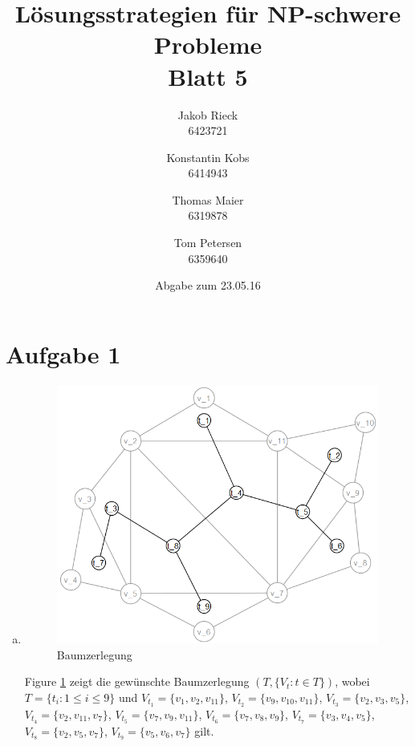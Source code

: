 \documentclass[12pt,a4paper]{article}
\title{Lösungsstrategien für NP-schwere Probleme\\Blatt 5}
\author{
		Jakob Rieck\\
		\small{6423721}
	\and
		Konstantin Kobs\\
		\small{6414943}
	\and
		Thomas Maier\\
		\small{6319878}
	\and
		Tom Petersen\\
		\small{6359640}
}
\date{Abgabe zum 23.05.16}
\begin{document}
\maketitle

\section*{Aufgabe 1}

 \begin{enumerate}[a)]

 	\item 
 	\begin{figure}[ht]
 		\centering
 		\includegraphics[scale=0.5]{Baumzerlegung.png}
 		\caption{Baumzerlegung}
 		\label{baumzerlegung1a}
 	\end{figure}
 	
 	Figure \ref{baumzerlegung1a} zeigt die gewünschte  Baumzerlegung $(T,\{V_t:t\in T \})$, wobei $T= \{t_i : 1 \le i \le 9\}$ und $V_{t_1}=\{v_1,v_2,v_{11}\}$, $V_{t_2}=\{v_9,v_{10},v_{11}\}$, $V_{t_3}=\{v_2,v_3,v_5\}$, $V_{t_4}=\{v_2,v_{11},v_7\}$, $V_{t_5}=\{v_7,v_9,v_{11}\}$, $V_{t_6}=\{v_7,v_8,v_9\}$, $V_{t_7}=\{v_3,v_4,v_5\}$, $V_{t_8}=\{v_2,v_5,v_7\}$, $V_{t_9}=\{v_5,v_6,v_7\}$ gilt.
 	

\end{enumerate}
\end{document}
